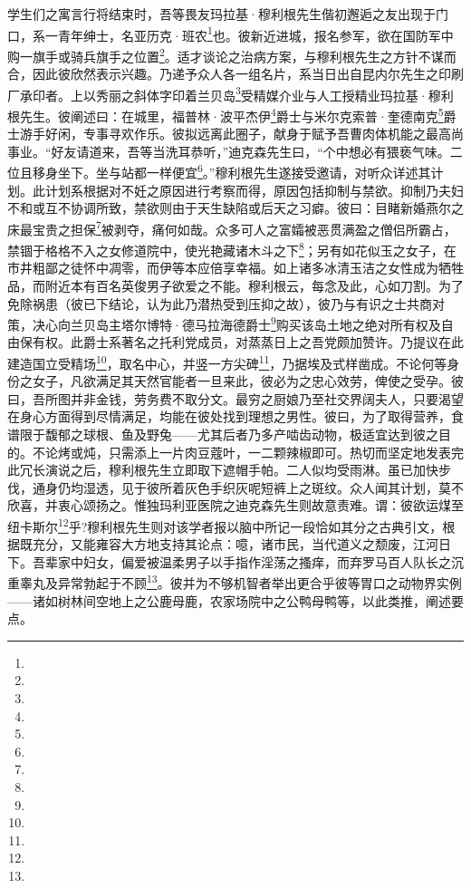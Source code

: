 \par 学生们之寓言行将结束时，吾等畏友玛拉基·穆利根先生偕初邂逅之友出现于门口，系一青年绅士，名亚历克·班农\footnote{}也。彼新近进城，报名参军，欲在国防军中购一旗手或骑兵旗手之位置\footnote{}。适才谈论之治病方案，与穆利根先生之方针不谋而合，因此彼欣然表示兴趣。乃递予众人各一组名片，系当日出自昆内尔先生之印刷厂承印者。上以秀丽之斜体字印着兰贝岛\footnote{}受精媒介业与人工授精业玛拉基·穆利根先生。彼阐述曰：在城里，福普林·波平杰伊\footnote{}爵士与米尔克索普·奎德南克\footnote{}爵士游手好闲，专事寻欢作乐。彼拟远离此圈子，献身于赋予吾曹肉体机能之最高尚事业。“好友请道来，吾等当洗耳恭听，”迪克森先生曰，“个中想必有猥亵气味。二位且移身坐下。坐与站都一样便宜\footnote{}。”穆利根先生遂接受邀请，对听众详述其计划。此计划系根据对不妊之原因进行考察而得，原因包括抑制与禁欲。抑制乃夫妇不和或互不协调所致，禁欲则由于天生缺陷或后天之习癖。彼曰：目睹新婚燕尔之床最宝贵之担保\footnote{}被剥夺，痛何如哉。众多可人之富孀被恶贯满盈之僧侣所霸占，禁锢于格格不入之女修道院中，使光艳藏诸木斗之下\footnote{}；另有如花似玉之女子，在市井粗鄙之徒怀中凋零，而伊等本应倍享幸福。如上诸多冰清玉洁之女性成为牺牲品，而附近本有百名英俊男子欲爱之不能。穆利根云，每念及此，心如刀割。为了免除祸患（彼已下结论，认为此乃潜热受到压抑之故），彼乃与有识之士共商对策，决心向兰贝岛主塔尔博特·德马拉海德爵士\footnote{}购买该岛土地之绝对所有权及自由保有权。此爵士系著名之托利党成员，对蒸蒸日上之吾党颇加赞许。乃提议在此建造国立受精场\footnote{}，取名中心，并竖一方尖碑\footnote{}，乃据埃及式样凿成。不论何等身份之女子，凡欲满足其天然官能者一旦来此，彼必为之忠心效劳，俾使之受孕。彼曰，吾所图并非金钱，劳务费不取分文。最穷之厨娘乃至社交界阔夫人，只要渴望在身心方面得到尽情满足，均能在彼处找到理想之男性。彼曰，为了取得营养，食谱限于馥郁之球根、鱼及野兔——尤其后者乃多产啮齿动物，极适宜达到彼之目的。不论烤或炖，只需添上一片肉豆蔻叶，一二颗辣椒即可。热切而坚定地发表完此冗长演说之后，穆利根先生立即取下遮帽手帕。二人似均受雨淋。虽已加快步伐，通身仍均湿透，见于彼所着灰色手织灰呢短裤上之斑纹。众人闻其计划，莫不欣喜，并衷心颂扬之。惟独玛利亚医院之迪克森先生则故意责难。谓：彼欲运煤至纽卡斯尔\footnote{}乎?穆利根先生则对该学者报以脑中所记一段恰如其分之古典引文，根据既充分，又能雍容大方地支持其论点：噫，诸市民，当代道义之颓废，江河日下。吾辈家中妇女，偏爱被温柔男子以手指作淫荡之搔痒，而弃罗马百人队长之沉重睾丸及异常勃起于不顾\footnote{}。彼并为不够机智者举出更合乎彼等胃口之动物界实例——诸如树林间空地上之公鹿母鹿，农家场院中之公鸭母鸭等，以此类推，阐述要点。
